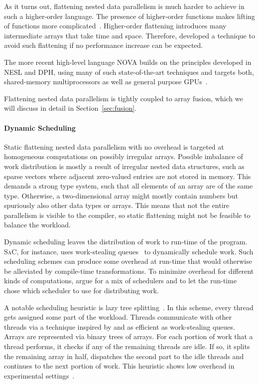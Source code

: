 \documentclass[a4paper]{article}
\newcommand{\sac}{S\textsc{a}C}
\begin{document}
As it turns out, flattening nested data parallelism is much harder to
achieve in such a higher-order language. The presence of higher-order
functions makes lifting of functions more
complicated~\cite{Lippmeier:2012:WEH:2364527.2364564}. Higher-order
flattening introduces many intermediate arrays that take time and
space. Therefore, \citet{Keller:2012:VA:2364506.2364512} developed a
technique to avoid such flattening if no performance increase can be
expected.

The more recent high-level language NOVA builds on the principles
developed in NESL and DPH, using many of such state-of-the-art
techniques and targets both, shared-memory multiprocessors as well as
general purpose GPUs~\cite{Collins:2014:NFL:2627373.2627375}.

Flattening nested data parallelism is tightly coupled to array fusion,
which we will discuss in detail in Section~\ref{sec:fusion}.

\paragraph{Dynamic Scheduling}

Static flattening nested data parallelism with no overhead is targeted
at homogeneous computations on possibly irregular arrays. Possible
imbalance of work distribution is mostly a result of irregular nested
data structures, such as sparse vectors where adjacent zero-valued
entries are not stored in memory. This demands a strong type system,
such that all elements of an array are of the same type. Otherwise, a
two-dimensional array might mostly contain numbers but spuriously also
other data types or arrays. This means that not the entire parallelism
is visible to the compiler, so static flattening might not be feasible
to balance the workload.

Dynamic scheduling leaves the distribution of work to run-time of the
program. \sac, for instance, uses work-stealing
queues~\cite{Chase2005Dynamic, Grelck:2007:SOS:1248648.1248654} to
dynamically schedule work. Such scheduling schemes can produce some
overhead at run-time that would otherwise be alleviated by
compile-time transformations. To minimize overhead for different kinds
of computations, \citet{Fluet:2008:SFG:1411204.1411239} argue for a
mix of schedulers and to let the run-time chose which scheduler to use
for distributing work.

A notable scheduling heuristic is lazy tree
splitting~\cite{Bergstrom:2010:LTS:1863543.1863558}. In this scheme,
every thread gets assigned some part of the workload. Threads
communicate with other threads via a technique inspired by and as
efficient as work-stealing queues. Arrays are represented via binary
trees of arrays. For each portion of work that a thread performs, it
checks if any of the remaining threads are idle. If so, it splits the
remaining array in half, dispatches the second part to the idle
threads and continues to the next portion of work. This heuristic
shows low overhead in experimental
settings~\cite{Bergstrom:2010:LTS:1863543.1863558}.
\end{document}

